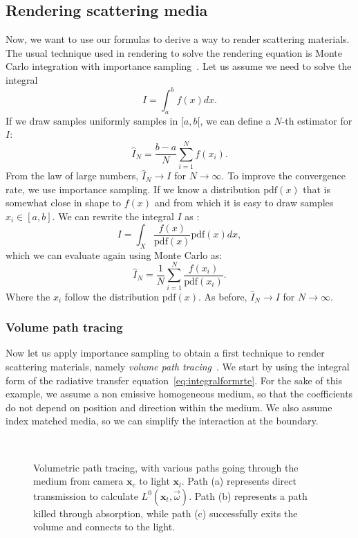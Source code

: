 \subsection{Rendering scattering media}
\label{sec:renderingscattering}
Now, we want to use our formulas to derive a way to render scattering materials. The usual technique used in rendering to solve the rendering equation is Monte Carlo integration with importance sampling~\cite{Kalos2008}. Let us assume we need to solve the integral
\begin{equation*}
I = \int_a^b f(x) dx.
\end{equation*}
If we draw samples uniformly samples in $[a,b[$, we can define a $N$-th estimator for $I$:
\begin{equation*}
\hat{I}_N = \frac{b-a}{N} \sum_{i=1}^N f(x_i).
\end{equation*}
From the law of large numbers, $\hat{I}_N \rightarrow I$ for $N \rightarrow \infty$. To improve the convergence rate, we use importance sampling. If we know a distribution $\text{pdf}(x)$ that is somewhat close in shape to $f(x)$ and from which it is easy to draw samples $x_i \in [a,b]$. We can rewrite the integral $I$ as :
\begin{equation*}
I = \int_X \frac{f(x)}{\text{pdf}(x)} \text{pdf}(x) dx,
\end{equation*}
which we can evaluate again using Monte Carlo as:
\begin{equation*}
\hat{I}_N = \frac{1}{N} \sum_{i=1}^N \frac{f(x_i)}{\text{pdf}(x_i)}.
\end{equation*}
Where the $x_i$ follow the distribution $\text{pdf}(x)$. As before, $\hat{I}_N \rightarrow I$ for $N \rightarrow \infty$.

\subsubsection{Volume path tracing}
Now let us apply importance sampling to obtain a first technique to render scattering materials, namely \emph{volume path tracing}~\cite{Rushmeier1988}. We start by using the integral form of the radiative transfer equation~\ref{eq:integralformrte}. For the sake of this example, we assume a non emissive homogeneous medium, so that the coefficients do not depend on position and direction within the medium. We also assume index matched media, so we can simplify the interaction at the boundary. 

\begin{figure}
\centering
   \def\svgwidth{0.7\textwidth}
    \\
\caption{Volumetric path tracing, with various paths going through the medium from camera $\mathbf{x}_c$ to light $\mathbf{x}_l$. Path (a) represents direct transmission to calculate $L^0(\mathbf{x}_t, \vec{\omega})$. Path (b) represents a path killed through absorption, while path (c) successfully exits the volume and connects to the light.} 
\label{fig:vpt}
\end{figure}


